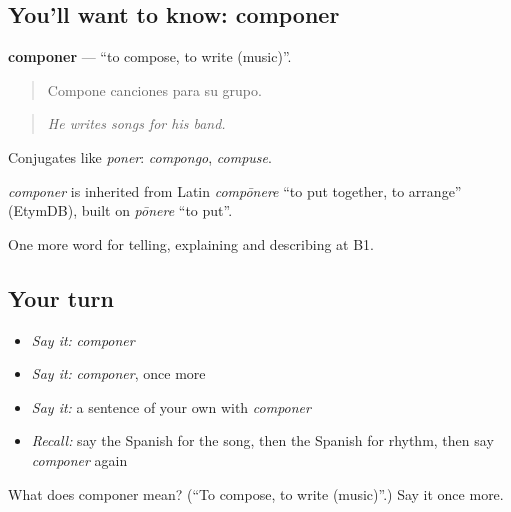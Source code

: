 \subsection*{You'll want to know: componer}
\textbf{componer} — \textquotedblleft{}to compose, to write (music)\textquotedblright{}.

\begin{quote}
Compone canciones para su grupo.
\end{quote}

\begin{quote}
\emph{He writes songs for his band.}
\end{quote}

Conjugates like \emph{poner}: \emph{compongo}, \emph{compuse}.

\begin{cousinweb}
\emph{componer} is inherited from Latin \emph{compōnere} \textquotedblleft{}to put together, to arrange\textquotedblright{} (EtymDB), built on \emph{pōnere} \textquotedblleft{}to put\textquotedblright{}.
\end{cousinweb}

\begin{grammarlens}[title={What you've built}]
One more word for telling, explaining and describing at B1.
\end{grammarlens}

\subsection*{Your turn}
\begin{itemize}
\raggedright
  \item \emph{Say it:} \emph{componer}
  \item \emph{Say it:} \emph{componer}, once more
  \item \emph{Say it:} a sentence of your own with \emph{componer}
  \item \emph{Recall:} say the Spanish for the song, then the Spanish for rhythm, then say \emph{componer} again
\end{itemize}

\begin{tcolorbox}[breakable,colback=teal!4,colframe=teal!35!black,title={Before you move on}]
What does componer mean? (\textquotedblleft{}To compose, to write (music)\textquotedblright{}.) Say it once more.
\end{tcolorbox}
